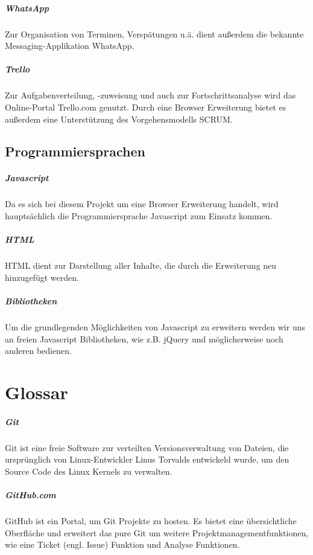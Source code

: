 \documentclass[11pt]{scrreprt}
\begin{document}
\paragraph{WhatsApp}
Zur Organisation von Terminen, Versp\"atungen u.ä. dient außerdem die bekannte Messaging-Applikation WhatsApp.
\paragraph{Trello}
Zur Aufgabenverteilung, -zuweisung und auch zur Fortschrittsanalyse wird das Online-Portal Trello.com genutzt. Durch eine Browser Erweiterung bietet es außerdem eine Unterstützung des Vorgehensmodells SCRUM.

\section{Programmiersprachen}
\paragraph{Javascript}
Da es sich bei diesem Projekt um eine Browser Erweiterung handelt, wird hauptsächlich die Programmiersprache Javascript zum Einsatz kommen.
\paragraph{HTML}
HTML dient zur Darstellung aller Inhalte, die durch die Erweiterung neu hinzugefügt werden.
\paragraph{Bibliotheken}
Um die grundlegenden Möglichkeiten von Javascript zu erweitern werden wir uns an freien Javascript Bibliotheken, wie z.B. jQuery und möglicherweise noch anderen bedienen.

\chapter{Glossar}
\paragraph{Git} Git ist eine freie Software zur verteilten Versionsverwaltung von Dateien, die ursprünglich von Linux-Entwickler Linus Torvalds entwickeld wurde, um den Source Code des Linux Kernels zu verwalten.

\paragraph{GitHub.com} GitHub ist ein Portal, um Git Projekte zu hosten. Es bietet eine übersichtliche Oberfläche und erweitert das pure Git um weitere Projektmanagementfunktionen, wie eine Ticket (engl. Issue) Funktion und Analyse Funktionen.
\end{document}
